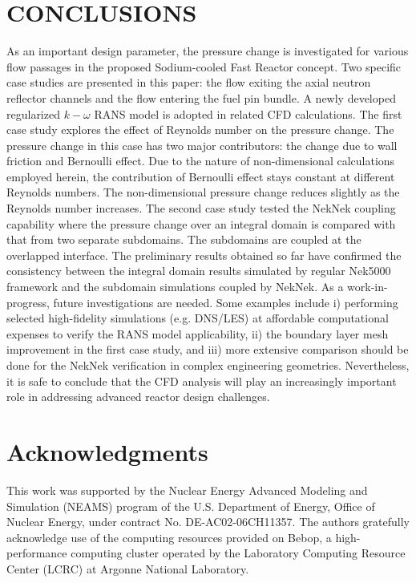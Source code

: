\documentclass[11pt,letterpaper,english]{article}
\begin{document}
\section{CONCLUSIONS}

As an important design parameter, the pressure change is investigated for various flow passages in the proposed Sodium-cooled Fast Reactor concept. Two specific case studies are presented in this paper: the flow exiting the axial neutron reflector channels and the flow entering the fuel pin bundle. A newly developed regularized $k-\omega$ RANS model is adopted in related CFD calculations. The first case study explores the effect of Reynolds number on the pressure change. The pressure change in this case has two major contributors: the change due to wall friction and Bernoulli effect. Due to the nature of non-dimensional calculations employed herein, the contribution of Bernoulli effect stays constant at different Reynolds numbers. The non-dimensional pressure change reduces slightly as the Reynolds number increases. The second case study tested the NekNek coupling capability where the pressure change over an integral domain is compared with that from two separate subdomains. The subdomains are coupled at the overlapped interface. The preliminary results obtained so far have confirmed the consistency between the integral domain results simulated by regular Nek5000 framework and the subdomain simulations coupled by NekNek. As a work-in-progress, future investigations are needed. Some examples include i) performing selected high-fidelity simulations (e.g. DNS/LES) at affordable computational expenses to verify the RANS model applicability, ii) the boundary layer mesh improvement in the first case study, and iii) more extensive comparison should be done for the NekNek verification in complex engineering geometries. Nevertheless, it is safe to conclude that the CFD analysis will play an increasingly important role in addressing advanced reactor design challenges. 


\section*{Acknowledgments}

This work was supported by the Nuclear Energy Advanced Modeling and Simulation (NEAMS) program of the U.S. Department of Energy, Office of Nuclear Energy, under contract No. DE-AC02-06CH11357. The authors gratefully acknowledge use of the computing resources provided on Bebop, a high-performance computing cluster operated by the Laboratory Computing Resource Center (LCRC) at Argonne National Laboratory. 
\end{document}
